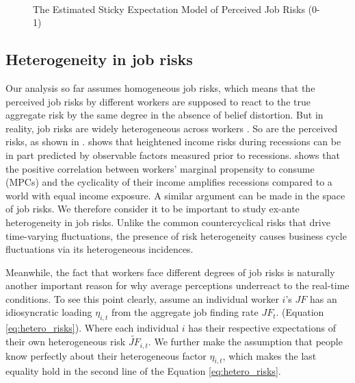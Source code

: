        \begin{figure}[pt]
    	\caption{The Estimated Sticky Expectation Model of Perceived Job Risks (0-1)}
	\label{fig:fitted_se}    
    	\begin{center}
		  \\
    	\end{center}
     
    	
    \end{figure}
    
\subsection{Heterogeneity in job risks}

Our analysis so far assumes homogeneous job risks, which means that the perceived job risks by different workers are supposed to react to the true aggregate risk by the same degree in the absence of belief distortion. But in reality, job risks are widely heterogeneous across workers \citet{hall2019job,ahn2020heterogeneity,gregory2021alpha}. So are the perceived risks, as shown in \cite{mueller2021job,wang2023perceived}. \cite{guvenen2014nature} shows that heightened income risks during recessions can be in part predicted by observable factors measured prior to recessions. \cite{patterson2023matching} shows that the positive correlation between workers' marginal propensity to consume (MPCs) and the cyclicality of their income amplifies recessions compared to a world with equal income exposure. A similar argument can be made in the space of job risks. We therefore consider it to be important to study ex-ante heterogeneity in job risks. Unlike the common countercyclical risks that drive time-varying fluctuations, the presence of risk heterogeneity causes business cycle fluctuations via its heterogeneous incidences.  

Meanwhile, the fact that workers face different degrees of job risks is naturally another important reason for why average perceptions underreact to the real-time conditions. To see this point clearly, assume an individual worker $i$'s $JF$ has an idiosyncratic loading $\eta_{i,t}$ from the aggregate job finding rate ${JF}_t$. (Equation \ref{eq:hetero_risks}). Where each individual $i$ has their respective expectations of their own heterogeneous risk $\widetilde{JF}_{i,t}$. We further make the assumption that people know perfectly about their heterogeneous factor $\eta_{i,t}$, which makes the last equality hold in the second line of the Equation \ref{eq:hetero_risks}. 

